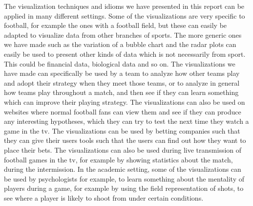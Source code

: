 \documentclass[Report.tex]{subfiles}
\begin{document}
The visualization techniques and idioms we have presented in this report can be applied in many different settings. Some of the visualizations
are very specific to football, for example the ones with a football field, but these can easily be adapted to visualize data from other branches
of sports. The more generic ones we have made such as the variation of a bubble chart and the radar plots can easily be used to present other
kinds of data which is not necessarily from sport. This could be financial data, biological data and so on.
The visualizations we have made can specifically be used by a team to analyze how other teams play
and adopt their strategy when they meet those teams, or to analyze in general how teams play throughout a match, and then see if they can learn
something which can improve their playing strategy. The visualizations can also be used on websites where normal football fans can view them and see if they
can produce any interesting hypotheses, which they can try to test the next time they watch a game in the tv. The visualizations can be used by
betting companies such that they can give their users tools such that the users can find out how they want to place their bets. The visualizations
can also be used during live transmission of football games in the tv, for example by showing statistics about the match, during the intermission.
In the academic setting, some of the visualizations can be used by psychologists for example, to learn something about the mentality of players during
a game, for example by using the field representation of shots, to see where a player is likely to shoot from under certain conditions.
\end{document}
